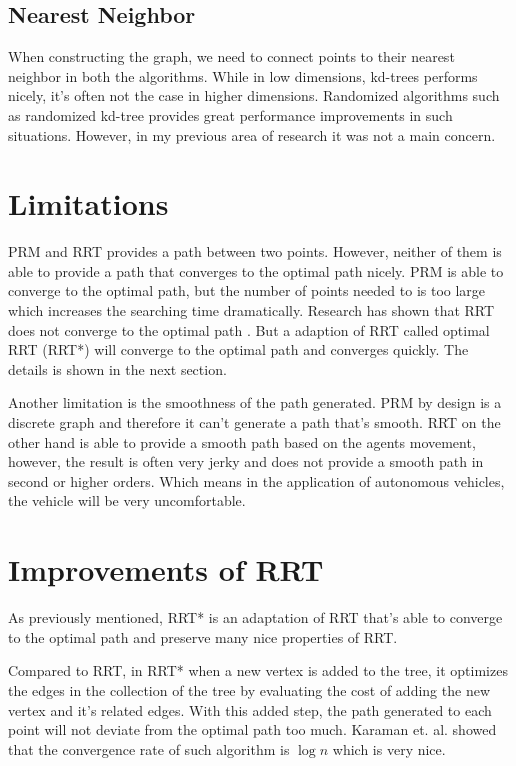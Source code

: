 \documentclass[12pt]{article}
\begin{document}
\subsection*{Nearest Neighbor}
When constructing the graph, we need to connect points to their nearest neighbor in both the algorithms. While in low dimensions, kd-trees performs nicely, it's often not the case in higher dimensions. Randomized algorithms such as randomized kd-tree provides great performance improvements in such situations. However, in my previous area of research it was not a main concern.

\section*{Limitations}
PRM and RRT provides a path between two points. However, neither of them is able to provide a path that converges to the optimal path nicely. PRM is able to converge to the optimal path, but the number of points needed to is too large which increases the searching time dramatically. Research has shown that RRT does not converge to the optimal path \cite{Karaman2010}. But a adaption of RRT called optimal RRT (RRT*) will converge to the optimal path and converges quickly. The details is shown in the next section.

Another limitation is the smoothness of the path generated. PRM by design is a discrete graph and therefore it can't generate a path that's smooth. RRT on the other hand is able to provide a smooth path based on the agents movement, however, the result is often very jerky and does not provide a smooth path in second or higher orders. Which means in the application of autonomous vehicles, the vehicle will be very uncomfortable. 

\section*{Improvements of RRT}
As previously mentioned, RRT* is an adaptation of RRT that's able to converge to the optimal path and preserve many nice properties of RRT.

Compared to RRT, in RRT* when a new vertex is added to the tree, it optimizes the edges in the collection of the tree by evaluating the cost of adding the new vertex and it's related edges. With this added step, the path generated to each point will not deviate from the optimal path too much. Karaman et. al. showed that the convergence rate of such algorithm is $\log{n}$ which is very nice.
\end{document}
